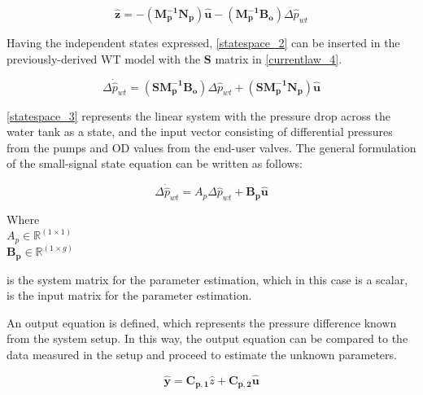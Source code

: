 \begin{equation}
 \bm{\hat{z}} = -(\bm{M_p^{-1}}\bm{N_p})\bm{\hat{u}} - (\bm{M_p^{-1}}\bm{B_o})\Delta \hat{p}_{wt}    
 \label{statespace_2}
\end{equation}

Having the independent states expressed, \eqref{statespace_2} can be inserted in the previously-derived WT model with the $\bm{S}$ matrix in \eqref{currentlaw_4}. 

\begin{equation}
\Delta \dot{\hat{p}}_{wt} = (\bm{S}\bm{M_p^{-1}}\bm{B_o}) \Delta \hat{p}_{wt}  + (\bm{S}\bm{M_p^{-1}}\bm{N_p}) \bm{\hat{u}} 
\label{statespace_3}
\end{equation}

\eqref{statespace_3} represents the linear system with the pressure drop across the water tank as a state, and the input vector consisting of differential pressures from the pumps and OD values from the end-user valves. The general formulation of the small-signal state equation can be written as follows:  

\begin{equation}
\Delta \dot{\hat{p}}_{wt} = A_p \Delta \hat{p}_{wt}  + \bm{B_p}\bm{\hat{u}}  
 \label{statespace_4}
\end{equation}

\begin{minipage}[t]{0.24\textwidth}
Where\\
\hspace*{8mm} $A_p \in \mathbb{R}^{(1 \times 1)} $ \\
\newline
\hspace*{8mm} $\bm{B_p} \in \bm{\mathbb{R}}^{(1 \times g)} $ 
\end{minipage}
\begin{minipage}[t]{0.74\textwidth}
\vspace*{2mm}
is the system matrix for the parameter estimation, which in this case is a scalar, \\
is the input matrix for the parameter estimation.
\end{minipage} 

An output equation is defined, which represents the pressure difference known from the system setup. In this way, the output equation can be compared 
to the data measured in the setup and proceed to estimate the unknown parameters. 

\begin{equation}
\bm{\hat{y}} = \bm{C_{p,1}} \hat{z}  + \bm{C_{p,2}}\bm{\hat{u}}  
 \label{statespace_5}
\end{equation}

